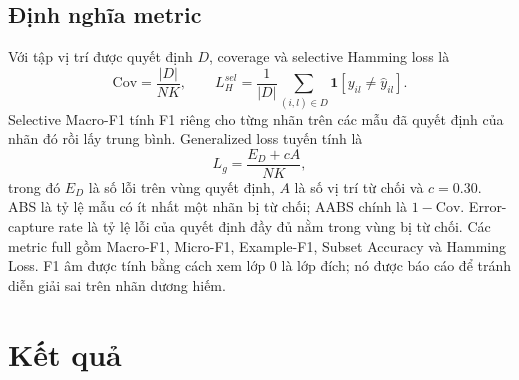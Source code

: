 \documentclass[11pt,a4paper,twoside]{article}
\begin{document}
\subsection{Định nghĩa metric}
Với tập vị trí được quyết định $D$, coverage và selective Hamming loss là
\begin{equation}\mathrm{Cov}=\frac{|D|}{NK},\qquad L_{H}^{sel}=\frac{1}{|D|}\sum_{(i,l)\in D}\mathbf{1}[y_{il}\ne\hat y_{il}].\end{equation}
Selective Macro-F1 tính F1 riêng cho từng nhãn trên các mẫu đã quyết định của nhãn đó rồi lấy trung bình. Generalized loss tuyến tính là
\begin{equation}L_g=\frac{E_D+cA}{NK},\end{equation}
trong đó $E_D$ là số lỗi trên vùng quyết định, $A$ là số vị trí từ chối và $c=0.30$. ABS là tỷ lệ mẫu có ít nhất một nhãn bị từ chối; AABS chính là $1-\mathrm{Cov}$. Error-capture rate là tỷ lệ lỗi của quyết định đầy đủ nằm trong vùng bị từ chối. Các metric full gồm Macro-F1, Micro-F1, Example-F1, Subset Accuracy và Hamming Loss. F1 âm được tính bằng cách xem lớp 0 là lớp đích; nó được báo cáo để tránh diễn giải sai trên nhãn dương hiếm.
\section{Kết quả}
\end{document}
